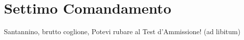 \section{Settimo Comandamento}
\begin{canzone}
Santannino, brutto coglione,
Potevi rubare al Test d'Ammissione!
(ad libitum)
\end{canzone}
